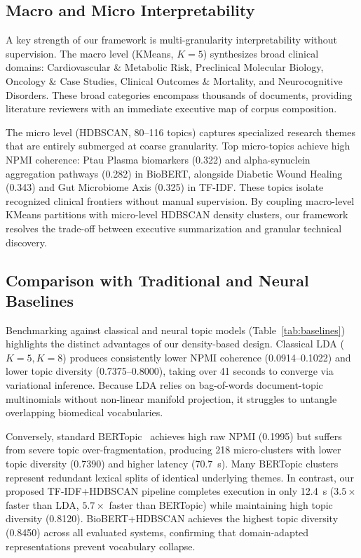 \documentclass[a4paper,10pt,conference]{IEEEtran}
\begin{document}
\subsection{Macro and Micro Interpretability}

A key strength of our framework is multi-granularity interpretability without supervision. The macro level (KMeans, $K=5$) synthesizes broad clinical domains: Cardiovascular \& Metabolic Risk, Preclinical Molecular Biology, Oncology \& Case Studies, Clinical Outcomes \& Mortality, and Neurocognitive Disorders. These broad categories encompass thousands of documents, providing literature reviewers with an immediate executive map of corpus composition.

The micro level (HDBSCAN, 80--116 topics) captures specialized research themes that are entirely submerged at coarse granularity. Top micro-topics achieve high NPMI coherence: Ptau Plasma biomarkers (0.322) and alpha-synuclein aggregation pathways (0.282) in BioBERT, alongside Diabetic Wound Healing (0.343) and Gut Microbiome Axis (0.325) in TF-IDF. These topics isolate recognized clinical frontiers without manual supervision. By coupling macro-level KMeans partitions with micro-level HDBSCAN density clusters, our framework resolves the trade-off between executive summarization and granular technical discovery.

\subsection{Comparison with Traditional and Neural Baselines}

Benchmarking against classical and neural topic models (Table~\ref{tab:baselines}) highlights the distinct advantages of our density-based design. Classical LDA ($K=5, K=8$) produces consistently lower NPMI coherence (0.0914--0.1022) and lower topic diversity (0.7375--0.8000), taking over 41 seconds to converge via variational inference. Because LDA relies on bag-of-words document-topic multinomials without non-linear manifold projection, it struggles to untangle overlapping biomedical vocabularies.

Conversely, standard BERTopic~\cite{ref17} achieves high raw NPMI (0.1995) but suffers from severe topic over-fragmentation, producing 218 micro-clusters with lower topic diversity (0.7390) and higher latency (70.7~s). Many BERTopic clusters represent redundant lexical splits of identical underlying themes. In contrast, our proposed TF-IDF+HDBSCAN pipeline completes execution in only 12.4~s ($3.5\times$ faster than LDA, $5.7\times$ faster than BERTopic) while maintaining high topic diversity (0.8120). BioBERT+HDBSCAN achieves the highest topic diversity (0.8450) across all evaluated systems, confirming that domain-adapted representations prevent vocabulary collapse.
\end{document}
